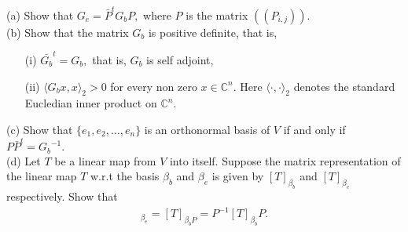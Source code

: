 (a) Show that  $G_e = {\bar{P}}^tG_bP,$ where $P$ is the matrix $(\!( P_{i,j})\!).$\\
(b) Show that the matrix $G_b$ is positive definite, that is, 
\begin{itemize}
\item[(i)] ${\bar{G_b}}^t= G_b,$ that is, $G_b$ is self adjoint,
\item[(ii)] $\langle G_b x,x\rangle_2 > 0$ for every non zero $x\in \mathbb C^n.$ Here $\langle\cdot,\cdot\rangle_2 $ denotes the standard Eucledian inner product on $\mathbb C^n.$
\end{itemize}
(c) Show that $\{e_1,e_2,\ldots,e_n\}$ is an orthonormal basis of $V$ if and only if $P {\bar{P}}^t={G_b}^{-1}.$\\
(d) Let $T$ be a linear map from $V$ into itself. Suppose the matrix representation of the linear map $T$ w.r.t the basis $\beta_b$ and $\beta_e$ is given by $[T]_{\beta_b}$
and $[T]_{\beta_e}$ respectively. Show that 
\begin{align*}
[T]_{\beta_e} = [T]_{{\beta_b}P} = P^{-1}[T]_{\beta_b} P.
\end{align*}
\horz
